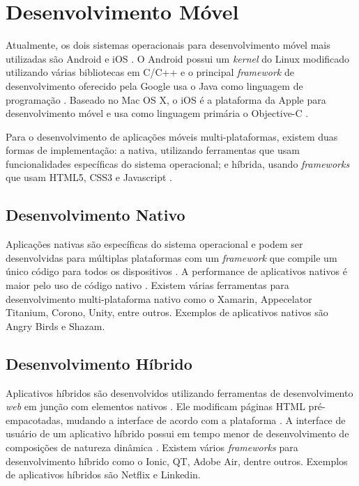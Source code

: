 \section{Desenvolvimento Móvel}

Atualmente, os dois sistemas operacionais para desenvolvimento móvel mais utilizadas são Android e iOS \cite{gartner-top-os}. O Android possui um \textit{kernel} do Linux modificado utilizando várias bibliotecas em C/C++ \cite{mobile-dev} e o principal \textit{framework} de desenvolvimento oferecido pela Google usa o Java como linguagem de programação \cite{android}. Baseado no Mac OS X, o iOS é a plataforma da Apple para desenvolvimento móvel e usa como linguagem primária o Objective-C \cite{mobile-dev}. 

Para o desenvolvimento de aplicações móveis multi-plataformas, existem duas formas de implementação: a nativa, utilizando ferramentas que usam funcionalidades específicas do sistema operacional; e híbrida, usando \textit{frameworks} que usam HTML5, CSS3 e Javascript \cite{mobile-dev-2}.

\subsection{Desenvolvimento Nativo}

Aplicações nativas são específicas do sistema operacional e podem ser desenvolvidas para múltiplas plataformas com um \textit{framework} que compile um único código para todos os dispositivos \cite{hybrid-1}. A performance de aplicativos nativos é maior pelo uso de código nativo \cite{hybrid-2}. Existem várias ferramentas para desenvolvimento multi-plataforma nativo como o Xamarin, Appecelator Titanium, Corono, Unity, entre outros. Exemplos de aplicativos nativos são Angry Birds e Shazam.

\subsection{Desenvolvimento Híbrido}

Aplicativos híbridos são desenvolvidos utilizando ferramentas de desenvolvimento \textit{web} em junção com elementos nativos \cite{hybrid-1}. Ele modificam páginas HTML pré-empacotadas, mudando a interface de acordo com a plataforma \cite{hybrid-2}. A interface de usuário de um aplicativo híbrido possui em tempo menor de desenvolvimento de composições de natureza dinâmica \cite{mobile-dev-2}. Existem vários \textit{frameworks} para desenvolvimento híbrido como o Ionic, QT, Adobe Air, dentre outros. Exemplos de aplicativos híbridos são Netflix e Linkedin.
